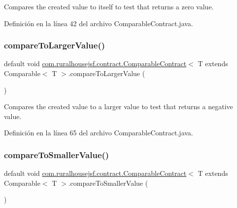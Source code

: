 Compares the created value to itself to test that returns a zero value. 



Definición en la línea 42 del archivo Comparable\+Contract.\+java.

\mbox{\label{interfacecom_1_1ruralhousejsf_1_1contract_1_1_comparable_contract_aceb2f65e9d26e521c6dc0eb2cbe6a35d}} 
\subsubsection{\texorpdfstring{compareToLargerValue()}{compareToLargerValue()}}
{\footnotesize\ttfamily default void \mbox{\hyperlink{interfacecom_1_1ruralhousejsf_1_1contract_1_1_comparable_contract}{com.\+ruralhousejsf.\+contract.\+Comparable\+Contract}}$<$ T extends Comparable$<$ T $>$.compare\+To\+Larger\+Value (\begin{DoxyParamCaption}{ }\end{DoxyParamCaption})}



Compares the created value to a larger value to test that returns a negative value. 



Definición en la línea 65 del archivo Comparable\+Contract.\+java.

\mbox{\label{interfacecom_1_1ruralhousejsf_1_1contract_1_1_comparable_contract_aa5df8ced74d7707d219de7d79eb04cb1}} 
\subsubsection{\texorpdfstring{compareToSmallerValue()}{compareToSmallerValue()}}
{\footnotesize\ttfamily default void \mbox{\hyperlink{interfacecom_1_1ruralhousejsf_1_1contract_1_1_comparable_contract}{com.\+ruralhousejsf.\+contract.\+Comparable\+Contract}}$<$ T extends Comparable$<$ T $>$.compare\+To\+Smaller\+Value (\begin{DoxyParamCaption}{ }\end{DoxyParamCaption})}



